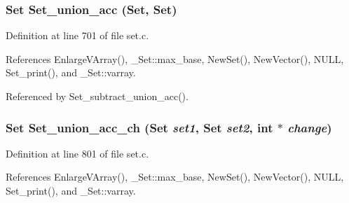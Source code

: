\subsubsection{\setlength{\rightskip}{0pt plus 5cm}\bf{Set} Set\_\-union\_\-acc (\bf{Set}, \bf{Set})}\label{set_8h_3bed87d554125c5a78ad723a256c40e6}




Definition at line 701 of file set.c.

References Enlarge\-VArray(), \_\-Set::max\_\-base, New\-Set(), New\-Vector(), NULL, Set\_\-print(), and \_\-Set::varray.

Referenced by Set\_\-subtract\_\-union\_\-acc().
\subsubsection{\setlength{\rightskip}{0pt plus 5cm}\bf{Set} Set\_\-union\_\-acc\_\-ch (\bf{Set} {\em set1}, \bf{Set} {\em set2}, int $\ast$ {\em change})}\label{set_8h_630ce90c9d12b610a191efc27527861a}




Definition at line 801 of file set.c.

References Enlarge\-VArray(), \_\-Set::max\_\-base, New\-Set(), New\-Vector(), NULL, Set\_\-print(), and \_\-Set::varray.